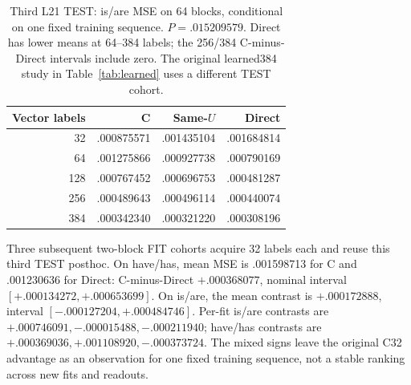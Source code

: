 \documentclass[11pt]{article}
\begin{document}
\begin{table}[ht]\centering\small
\begin{tabular}{rrrr}\toprule Vector labels & C & Same-$U$ & Direct\\\midrule
32 & .000875571 & .001435104 & .001684814\\
64 & .001275866 & .000927738 & .000790169\\
128 & .000767452 & .000696753 & .000481287\\
256 & .000489643 & .000496114 & .000440074\\
384 & .000342340 & .000321220 & .000308196\\\bottomrule\end{tabular}
\caption{Third L21 TEST: is/are MSE on 64 blocks, conditional on one fixed training sequence. $P=.015209579$. Direct has lower means at 64--384 labels; the 256/384 C-minus-Direct intervals include zero. The original learned384 study in Table~\ref{tab:learned} uses a different TEST cohort.}\label{tab:budget}
\end{table}

Three subsequent two-block FIT cohorts acquire 32 labels each and reuse this third TEST posthoc. On have/has, mean MSE is .001598713 for C and .001230636 for Direct: C-minus-Direct $+.000368077$, nominal interval $[+.000134272,+.000653699]$. On is/are, the mean contrast is $+.000172888$, interval $[-.000127204,+.000484746]$. Per-fit is/are contrasts are $+.000746091,-.000015488,-.000211940$; have/has contrasts are $+.000369036,+.001108920,-.000373724$. The mixed signs leave the original C32 advantage as an observation for one fixed training sequence, not a stable ranking across new fits and readouts.
\end{document}

